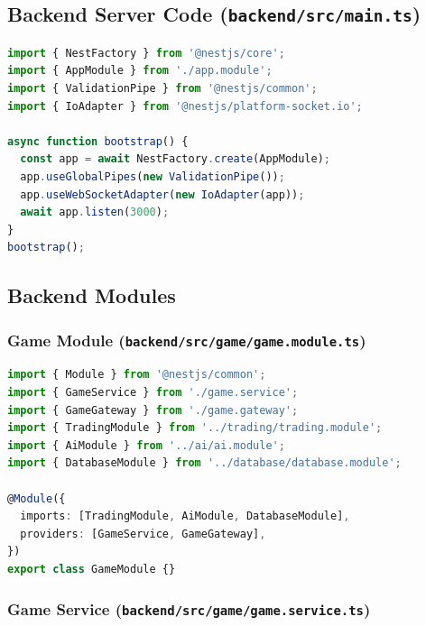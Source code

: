 \documentclass[11pt,a4paper]{article}
\begin{document}
\subsection{Backend Server Code (\texttt{backend/src/main.ts})}

\begin{lstlisting}[language=TypeScript, caption={Backend Server Entry Point}]
import { NestFactory } from '@nestjs/core';
import { AppModule } from './app.module';
import { ValidationPipe } from '@nestjs/common';
import { IoAdapter } from '@nestjs/platform-socket.io';

async function bootstrap() {
  const app = await NestFactory.create(AppModule);
  app.useGlobalPipes(new ValidationPipe());
  app.useWebSocketAdapter(new IoAdapter(app));
  await app.listen(3000);
}
bootstrap();
\end{lstlisting}

\subsection{Backend Modules}

\subsubsection{Game Module (\texttt{backend/src/game/game.module.ts})}

\begin{lstlisting}[language=TypeScript, caption={Game Module}]
import { Module } from '@nestjs/common';
import { GameService } from './game.service';
import { GameGateway } from './game.gateway';
import { TradingModule } from '../trading/trading.module';
import { AiModule } from '../ai/ai.module';
import { DatabaseModule } from '../database/database.module';

@Module({
  imports: [TradingModule, AiModule, DatabaseModule],
  providers: [GameService, GameGateway],
})
export class GameModule {}
\end{lstlisting}

\subsubsection{Game Service (\texttt{backend/src/game/game.service.ts})}
\end{document}
